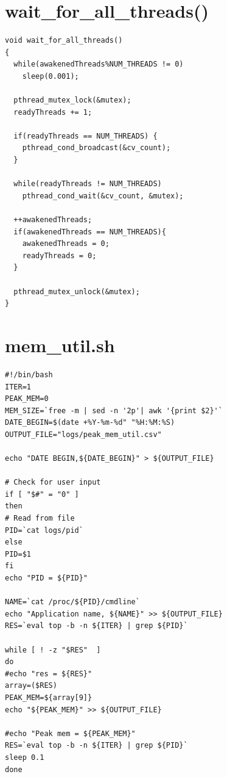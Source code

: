 \newpage
\section{wait\_for\_all\_threads()}
\label{app:code:wait_for_others}

\begin{lstlisting}[caption=Wait for other threads to join]
void wait_for_all_threads()
{
  while(awakenedThreads%NUM_THREADS != 0)
    sleep(0.001);

  pthread_mutex_lock(&mutex);
  readyThreads += 1;

  if(readyThreads == NUM_THREADS) {
    pthread_cond_broadcast(&cv_count);
  }

  while(readyThreads != NUM_THREADS)
    pthread_cond_wait(&cv_count, &mutex);

  ++awakenedThreads;
  if(awakenedThreads == NUM_THREADS){
    awakenedThreads = 0;
    readyThreads = 0;
  }

  pthread_mutex_unlock(&mutex);
}
\end{lstlisting}

\lstset{ %
  language=bash
}
\newpage
\section{mem\_util.sh}
\label{app:code:mem_util}
\begin{lstlisting}[caption=Peak Memory Utilization]
#!/bin/bash
ITER=1
PEAK_MEM=0
MEM_SIZE=`free -m | sed -n '2p'| awk '{print $2}'`
DATE_BEGIN=$(date +%Y-%m-%d" "%H:%M:%S)
OUTPUT_FILE="logs/peak_mem_util.csv"

echo "DATE BEGIN,${DATE_BEGIN}" > ${OUTPUT_FILE}

# Check for user input
if [ "$#" = "0" ]
then
# Read from file
PID=`cat logs/pid`
else
PID=$1
fi
echo "PID = ${PID}"

NAME=`cat /proc/${PID}/cmdline`
echo "Application name, ${NAME}" >> ${OUTPUT_FILE}
RES=`eval top -b -n ${ITER} | grep ${PID}`

while [ ! -z "$RES"  ]
do
#echo "res = ${RES}"
array=($RES)
PEAK_MEM=${array[9]}
echo "${PEAK_MEM}" >> ${OUTPUT_FILE}

#echo "Peak mem = ${PEAK_MEM}"
RES=`eval top -b -n ${ITER} | grep ${PID}`
sleep 0.1
done
\end{lstlisting}
